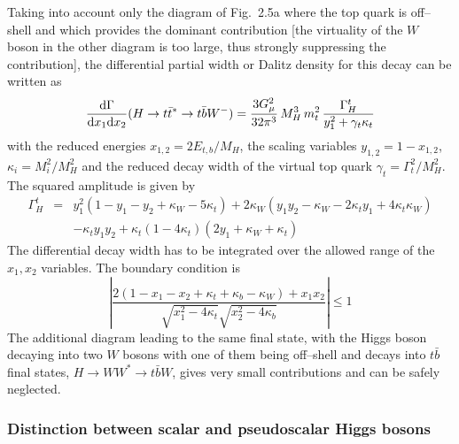 Taking into account only the diagram of Fig.~2.5a where the top quark is
off--shell and which provides the dominant contribution [the virtuality of the 
$W$ boson in the other diagram is too large, thus strongly suppressing the
contribution], the differential partial width or Dalitz density for this 
decay can be written as 
\begin{equation}
\frac{{\rm d} \Gamma}{{\rm d}x_1 {\rm d} x_2} (H\to t\bar{t}^*\to t 
\bar{b}W^-) = \frac{3G_\mu^2} {32\pi^3} \, M_H^3 \, m_t^2 \, \frac{\Gamma_H^t}
{y_1^2 + \gamma_t \kappa_t}
\label{eq:httdalitz}
\end{equation}
with the reduced energies $x_{1,2}=2E_{t,b}/M_H$, the scaling variables
$y_{1,2} = 1-x_{1,2}$, $\kappa_i = M_i^2/M_H^2$ and the reduced decay width
of the virtual top quark $\gamma_t=\Gamma_t^2/M_H^2$. The squared amplitude 
is given by \cite{Three-Body}
\begin{eqnarray}
\Gamma_H^t & = & y_1^2(1-y_1-y_2+\kappa_W-5\kappa_t) + 2\kappa_W(y_1y_2-\kappa_W
-2\kappa_ty_1+4\kappa_t\kappa_W) \nonumber \\
& & -\kappa_ty_1y_2+\kappa_t(1-4\kappa_t)(2y_1+\kappa_W+\kappa_t) 
\end{eqnarray} 
The differential decay width has to be integrated over the allowed range of the
$x_1, x_2$ variables. The boundary condition is 
\begin{equation}
\left| \frac{2(1-x_1-x_2+\kappa_t+\kappa_b-\kappa_W) + x_1x_2}
{\sqrt{x_1^2-4\kappa_t} \sqrt{x_2^2-4\kappa_b}} \right| \leq 1 
\label{eq:dalitzbound}
\end{equation}
The additional diagram leading to the same final state,  with the Higgs boson
decaying into two $W$ bosons with one of them being off--shell and
decays into $t\bar{b}$ final states, $H \to WW^* \to t\bar{b}W$, 
gives very small contributions and can be safely neglected. \s

\subsubsection{Distinction between scalar and pseudoscalar Higgs bosons}

